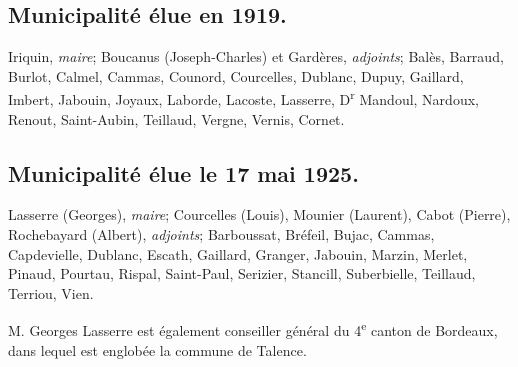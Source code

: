 \documentclass[a4paper,11pt]{book}
\begin{document}
\subsection{Municipalité élue en 1919.}

Iriquin, \textit{maire}; Boucanus (Joseph-Charles) et Gardères, \textit{adjoints}; Balès, Barraud, Burlot, Calmel, Cammas, Counord, Courcelles, Dublanc, Dupuy, Gaillard, Imbert, Jabouin, Joyaux, Laborde, Lacoste, Lasserre, D\textsuperscript{r} Mandoul, Nardoux, Renout, Saint-Aubin, Teillaud, Vergne, Vernis, Cornet.

\subsection{Municipalité élue le 17 mai 1925.}

Lasserre (Georges), \textit{maire}; Courcelles (Louis), Mounier (Laurent), Cabot (Pierre), Rochebayard (Albert), \textit{adjoints}; Barboussat, Bréfeil, Bujac, Cammas, Capdevielle, Dublanc, Escath, Gaillard, Granger, Jabouin, Marzin, Merlet, Pinaud, Pourtau, Rispal, Saint-Paul, Serizier, Stancill, Suberbielle, Teillaud, Terriou, Vien.

M. Georges Lasserre est également conseiller général du 4\textsuperscript{e} canton de Bordeaux, dans lequel est englobée la commune de Talence.
\end{document}
